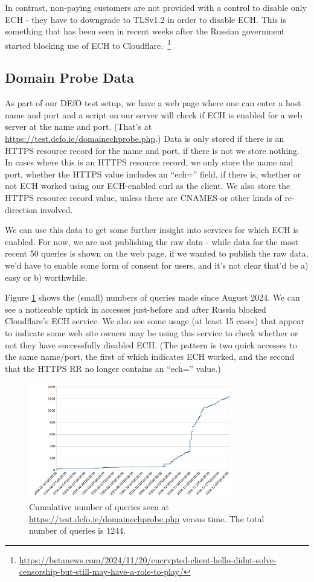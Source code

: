 In contrast, non-paying customers are not provided with a control to disable
only ECH - they have to downgrade to TLSv1.2 in order to disable ECH. This
is something that has been seen in recent weeks after the Russian government
started blocking use of ECH to
Cloudflare.~\footnote{\url{https://betanews.com/2024/11/20/encrypted-client-hello-didnt-solve-censorship-but-still-may-have-a-role-to-play/}}

\subsection{Domain Probe Data}

As part of our DEfO test setup, we have a web page where one can enter a host
name and port and a script on our server will check if ECH is enabled for a web
server at the name and port. (That's at
\url{https://test.defo.ie/domainechprobe.php}.) Data is only stored if there is
an HTTPS resource record for the name and port, if there is not we store
nothing. In cases where this is an HTTPS resource record, we only store the
name and port, whether the HTTPS value includes an ``ech='' field, if there is,
whether or not ECH worked using our ECH-enabled curl as the client. We also
store the HTTPS resource record value, unless there are CNAMES or other
kinds of re-direction involved.

We can use this data to get some further insight into services for which ECH
is enabled. For now, we are not publishing the raw data - while data for the most
recent 50 queries is shown on the web page, if we wanted to publish the raw
data, we'd have to enable some form of consent for users, and it's not clear
that'd be a) easy or b) worthwhile.

Figure \ref{fig:qtimes} shows the (small) numbers of queries made since August
2024. We can see a noticeable uptick in accesses just-before and after Russia
blocked Cloudflare's ECH service. We also see some usage (at least 15 cases) that
appear to indicate some web site owners may be using this service to check
whether or not they have successfully disabled ECH. (The pattern is two quick
accesses to the same name/port, the first of which indicates ECH worked, and
the second that the HTTPS RR no longer contains an ``ech='' value.)

\begin{figure}
	\centering
	\includegraphics[width=0.8\textwidth,keepaspectratio]{domainprobequeries.png}
		\caption[clustediag]{Cumulative number of queries seen at 
        \url{https://test.defo.ie/domainechprobe.php} versus time. 
        The total number of queries is 1244.} 
	\label{fig:qtimes}
\end{figure}


